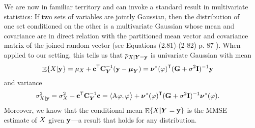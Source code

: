 \documentclass[11pt, english,english]{article}
\def\V#1{{\boldsymbol{#1}}}         %
\def\M#1{{\bf{#1}}}  %
\def\Op#1{{\mathrm{#1}}}  %
\def\Exp{\mathop{\mathbb{E}}\nolimits}
\renewcommand{\[}{\begin{equation}}
\renewcommand{\]}[1]{\label{eq:#1}\end{equation}}
\def\Exp{\mathop{\mathbb{E}}\nolimits}
\def\Rand#1{{\uppercase{#1}}}         %
\def\VRand#1{{\uppercase{\boldsymbol #1}}}         %
\newcommand{\Tr}{\mathsf{T}}
\begin{document}
We are now in familiar territory and can invoke a standard result in multivariate statistics:
If two sets of variables are jointly Gaussian, then the distribution of one set conditioned on the other is a multivariate Gaussian whose mean and covariance are in direct relation with the partitioned mean vector and covariance matrix of the joined random vector (see Equations (2.81)-(2-82) p. 87 \cite{Bishop2006}). When applied to our setting, this tells us that
$
p_{\Rand X|\VRand Y=\M y}
$
is univariate Gaussian with mean
\begin{align}
\Exp\{\Rand X|\M y\}=\mu_\Rand X + \M c^\Tr \M C^{-1}_{\VRand Y}(\M y-\V \mu_{\VRand Y})= \V \nu^\ast(\varphi)^\Tr (\M G + \sigma^2 \M I)^{-1} \M y
\end{align}
and variance
\begin{align}
\sigma^2_{\Rand X|\M y}=\sigma_\Rand X^2-   \M c^\Tr \M C^{-1}_{\VRand Y}\M c=\langle \Op A \varphi,\varphi\big\rangle + \V \nu^\ast(\varphi)^\Tr  (\M G + \sigma^2 \M I)^{-1}   \V \nu^\ast(\varphi). 
\end{align}
Moreover, we know that the conditional mean $\Exp\{\Rand X|\VRand Y=\M y\}$ is the MMSE estimate of $\Rand X$ given $\M y$---a result that holds for any distribution.
\end{document}

